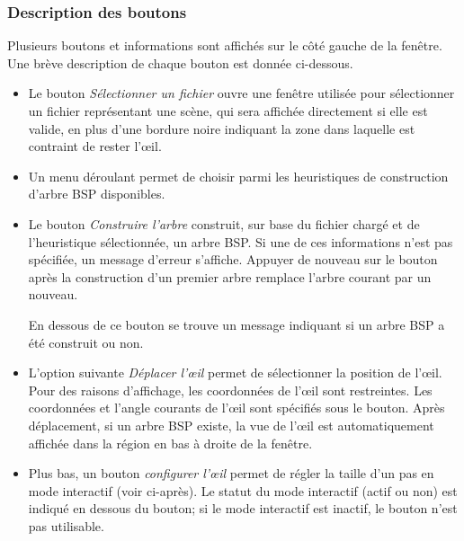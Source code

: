 \subsubsection*{Description des boutons}
Plusieurs boutons et informations sont affichés sur le côté gauche de
la fenêtre. Une brève description de chaque bouton est donnée ci-dessous.
\begin{itemize}
\item Le bouton \emph{Sélectionner un fichier} ouvre une fenêtre utilisée
  pour sélectionner un fichier représentant une scène, qui sera affichée
  directement si elle est valide, en plus d'une bordure noire indiquant
  la zone dans laquelle est contraint de rester l'\oe{}il.
\item Un menu déroulant permet
  de choisir parmi les heuristiques
  de construction d'arbre BSP disponibles.
\item Le bouton \emph{Construire l'arbre} construit, sur base du fichier
  chargé et de l'heuristique sélectionnée, un arbre BSP.
  Si une de ces informations n'est pas spécifiée, un message d'erreur s'affiche.
  Appuyer de nouveau sur le bouton après la construction d'un premier arbre
  remplace l'arbre courant par un nouveau.

  En dessous de ce bouton se trouve un message indiquant si  un arbre BSP a été
  construit ou non.
\item L'option suivante \emph{Déplacer l'\oe{}il} permet de sélectionner
  la position de l'\oe{}il. Pour des raisons d'affichage, les coordonnées de
  l'\oe{}il sont restreintes. Les coordonnées et l'angle courants de
  l'\oe{}il sont spécifiés sous le bouton. Après déplacement, si un arbre
  BSP existe, la vue de l'\oe{}il est automatiquement affichée dans la région
  en bas à droite de la fenêtre.
\item Plus bas, un bouton \emph{configurer l'\oe{}il} permet de régler la
  taille d'un pas en mode interactif (voir ci-après). Le statut du mode
  interactif (actif ou non) est indiqué en dessous du bouton; si
  le mode interactif est inactif, le bouton n'est pas utilisable.
\end{itemize}
